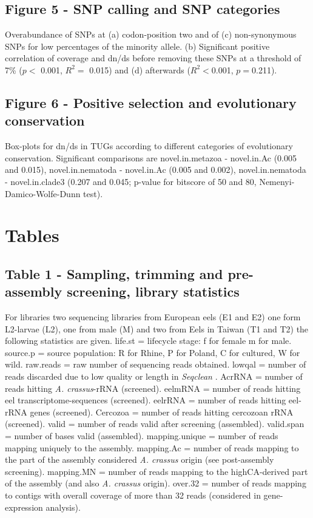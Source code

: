 \documentclass[10pt]{bmc_article}
\newenvironment{bmcformat}{\begin{raggedright}\baselineskip20pt\sloppy\setboolean{publ}{false}}{\end{raggedright}\baselineskip20pt\sloppy}
\begin{document}
\begin{bmcformat}
\subsection*{Figure 5 - SNP calling and SNP categories}
 
Overabundance of SNPs at (a) codon-position two and of (c)
non-synonymous SNPs for low percentages of the minority allele. (b)
Significant positive correlation of coverage and dn/ds before removing
these SNPs at a threshold of 7\% ($p<$ 0.001, $R^2=$
0.015) and (d) afterwards
($R^2<$0.001,
$p=$0.211).


\subsection*{Figure 6 - Positive selection and evolutionary
  conservation}

Box-plots for dn/ds in TUGs according to different categories of
evolutionary conservation. Significant comparisons are
novel.in.metazoa - novel.in.Ac (0.005 and 0.015), novel.in.nematoda -
novel.in.Ac (0.005 and 0.002), novel.in.nematoda - novel.in.clade3
(0.207 and 0.045; p-value for bitscore of 50 and 80,
Nemenyi-Damico-Wolfe-Dunn test).

\newpage

\section*{Tables}
\subsection*{Table 1 - Sampling, trimming and pre-assembly screening,
  library statistics}

For libraries two sequencing libraries from European eels (E1 and E2)
one form L2-larvae (L2), one from male (M) and two from Eels in Taiwan
(T1 and T2) the following statistics are given. life.st = lifecycle
stage: f for female m for male. source.p = source population: R for
Rhine, P for Poland, C for cultured, W for wild. raw.reads = raw
number of sequencing reads obtained. lowqal = number of reads
discarded due to low quality or length in \textit{Seqclean}
\cite{tgicl_pertea}. AcrRNA = number of reads hitting
\textit{A. crassus}-rRNA (screened). eelmRNA = number of reads hitting
eel transcriptome-sequences (screened). eelrRNA = number of reads
hitting eel-rRNA genes (screened). Cercozoa = number of reads hitting
cercozoan rRNA (screened). valid = number of reads valid after
screening (assembled). valid.span = number of bases valid (assembled).
mapping.unique = number of reads mapping uniquely to the
assembly. mapping.Ac = number of reads mapping to the part of the
assembly considered \textit{A. crassus} origin (see post-assembly
screening). mapping.MN = number of reads mapping to the highCA-derived
part of the assembly (and also \textit{A. crassus} origin). over.32 =
number of reads mapping to contigs with overall coverage of more than
32 reads (considered in gene-expression analysis).


\end{bmcformat}
\end{document}
